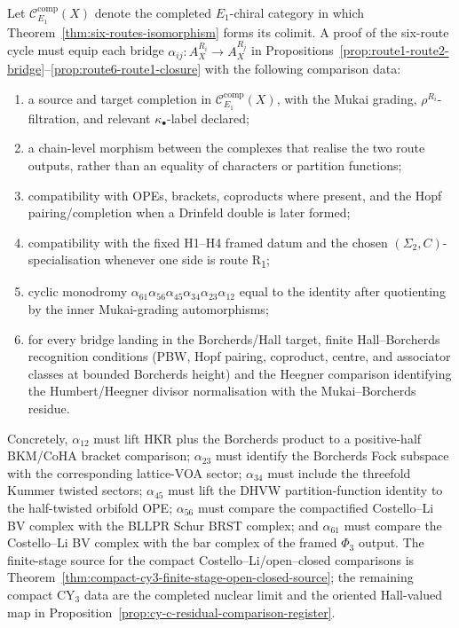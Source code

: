 \begin{proposition}
\label{prop:cy-c-bridge-obligations}
Let $\mathcal{C}^{\mathrm{comp}}_{E_1}(X)$ denote the completed
$E_1$-chiral category in which Theorem~\ref{thm:six-routes-isomorphism}
forms its colimit. A proof of the six-route cycle must equip each bridge
$\alpha_{ij}\colon A_X^{R_i}\to A_X^{R_j}$ in
Propositions~\ref{prop:route1-route2-bridge}--\ref{prop:route6-route1-closure}
with the following comparison data:
\begin{enumerate}[label=\textup{(\roman*)}]
 \item a source and target completion in
 $\mathcal{C}^{\mathrm{comp}}_{E_1}(X)$, with the Mukai grading,
 $\rho^{R_i}$-filtration, and relevant $\kappa_\bullet$-label declared;
 \item a chain-level morphism between the complexes that realise the two
 route outputs, rather than an equality of characters or partition
 functions;
 \item compatibility with OPEs, brackets, coproducts where present, and
 the Hopf pairing/completion when a Drinfeld double is later formed;
 \item compatibility with the fixed H1--H4 framed datum and the chosen
 $(\Sigma_2,C)$-specialisation whenever one side is route
 R\textsubscript{1};
 \item cyclic monodromy
 $\alpha_{61}\alpha_{56}\alpha_{45}\alpha_{34}\alpha_{23}\alpha_{12}$
 equal to the identity after quotienting by the inner
 Mukai-grading automorphisms;
 \item for every bridge landing in the Borcherds/Hall target, finite
 Hall--Borcherds recognition conditions (PBW, Hopf pairing, coproduct,
 centre, and associator classes at bounded Borcherds height) and the
 Heegner comparison identifying the Humbert/Heegner divisor normalisation
 with the Mukai--Borcherds residue.
\end{enumerate}
Concretely, $\alpha_{12}$ must lift HKR plus the Borcherds product to a
positive-half BKM/CoHA bracket comparison; $\alpha_{23}$ must identify
the Borcherds Fock subspace with the corresponding lattice-VOA sector;
$\alpha_{34}$ must include the threefold Kummer twisted sectors;
	$\alpha_{45}$ must lift the DHVW partition-function identity to the
	half-twisted orbifold OPE; $\alpha_{56}$ must compare the compactified
	Costello--Li BV complex with the BLLPR Schur BRST complex; and
	$\alpha_{61}$ must compare the Costello--Li BV complex with the bar
	complex of the framed $\Phi_3$ output. The finite-stage source for the
	compact Costello--Li/open--closed comparisons is
	Theorem~\ref{thm:compact-cy3-finite-stage-open-closed-source}; the
	remaining compact CY$_3$ data are the completed nuclear limit and the
	oriented Hall-valued map in
	Proposition~\ref{prop:cy-c-residual-comparison-register}.
\end{proposition}

